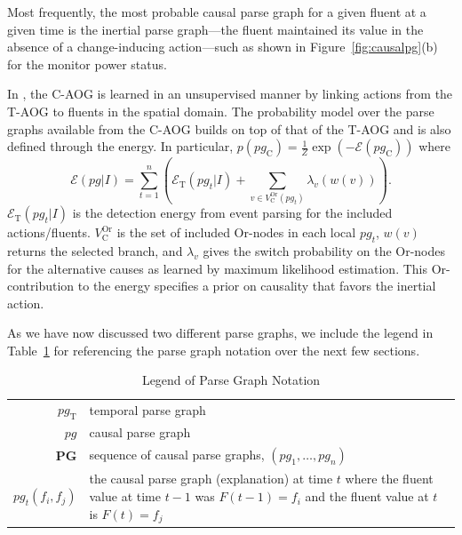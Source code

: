 \documentclass[10pt,journal,letterpaper,compsoc]{IEEEtran}
\begin{document}
Most frequently, the most probable causal parse graph for a given fluent at a given time is the inertial parse graph---the fluent maintained its value in the absence of a change-inducing action---such as shown in Figure~\ref{fig:causalpg}(b) for the monitor power status.



In \cite{morrow2012pami}, the C-AOG is learned in an unsupervised manner by linking actions from the T-AOG to fluents in the spatial domain.  The probability model over the parse graphs available from the C-AOG builds on top of that of the T-AOG and is also defined through the energy.  In particular, $p(pg_\mathrm{C}) = \frac{1}{Z} \exp\left( -\mathcal{E}\left(pg_\mathrm{C} \right) \right)$ where 
\begin{equation}
\mathcal{E}(pg|I)  = \sum_{t=1}^n   \left(\mathcal{E}_{\mathrm{T}}(pg_t|I) + \sum_{v \in V_{\mathrm{C}}^{\mathrm{Or}}(pg_t)} \lambda_v(w(v))\right) .
\end{equation}
$\mathcal{E}_{\mathrm{T}}(pg_t|I)$ is the detection energy from event parsing for the included actions/fluents.  $V_{\mathrm{C}}^{\mathrm{Or}}$ is the set of included Or-nodes in each local $pg_t$, $w(v)$ returns the selected branch, and $\lambda_v$ gives the switch probability on the Or-nodes for the alternative causes as learned by maximum likelihood estimation.  This Or-contribution to the energy specifies a prior on causality that favors the inertial action.  

As we have now discussed two different parse graphs, we include the legend in Table~\ref{tab:pgs} for referencing the parse graph notation over the next few sections.

\begin{table}[htp]
\centering
\caption{Legend of Parse Graph Notation}
\begin{tabular}{rp{2in}}
$pg_\mathrm{T}$ & temporal parse graph \\
$pg$ & causal parse graph \\
$\mathbf{PG}$ & sequence of causal parse graphs, $(pg_1, \ldots, pg_n)$ \\
$pg_t(f_i, f_j)$ & the causal parse graph (explanation) at time $t$ where the fluent value at time $t-1$ was $F(t-1) = f_i$ and the fluent value at $t$ is $F(t) = f_j$
\label{tab:pgs}
\end{tabular}
\end{table}



\end{document}
